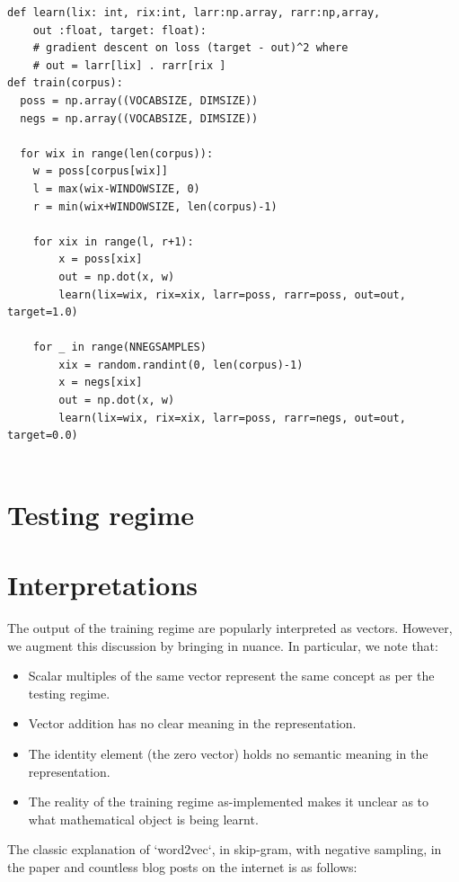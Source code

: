 \documentclass{book}
\begin{document}
\begin{verbatim}
def learn(lix: int, rix:int, larr:np.array, rarr:np,array,
    out :float, target: float):
    # gradient descent on loss (target - out)^2 where
    # out = larr[lix] . rarr[rix ]
def train(corpus):
  poss = np.array((VOCABSIZE, DIMSIZE))
  negs = np.array((VOCABSIZE, DIMSIZE))

  for wix in range(len(corpus)):
    w = poss[corpus[wix]]
    l = max(wix-WINDOWSIZE, 0)
    r = min(wix+WINDOWSIZE, len(corpus)-1)

    for xix in range(l, r+1):
        x = poss[xix]
        out = np.dot(x, w)
        learn(lix=wix, rix=xix, larr=poss, rarr=poss, out=out, target=1.0)

    for _ in range(NNEGSAMPLES)
        xix = random.randint(0, len(corpus)-1)
        x = negs[xix]
        out = np.dot(x, w)
        learn(lix=wix, rix=xix, larr=poss, rarr=negs, out=out, target=0.0)
    
\end{verbatim}


\section{Testing regime}

\section{Interpretations}



The output of the training regime are popularly interpreted as vectors. However,
we augment this discussion by bringing in nuance. In particular, we note that:
\begin{itemize}
\item Scalar multiples of the same vector represent the same concept as per the testing regime.
\item Vector addition has no clear meaning in the representation.
\item The identity element (the zero vector) holds no semantic meaning in the representation.
\item The reality of the training regime as-implemented makes it unclear as to
      what mathematical object is being learnt.
\end{itemize}

The classic explanation of `word2vec`, in skip-gram, with negative sampling,
in the paper and countless blog posts on the internet is as follows:
\end{document}
